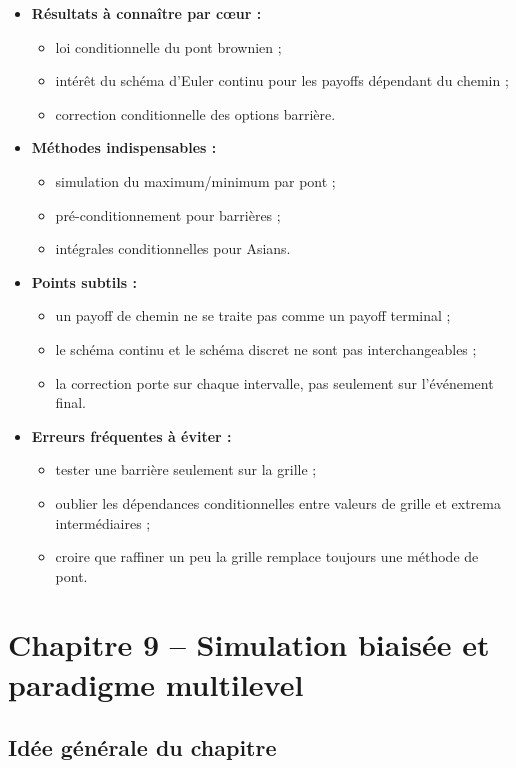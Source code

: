 \documentclass[11pt,a4paper]{article}
\begin{document}
\begin{itemize}
  \item \textbf{Résultats à connaître par cœur :}
  \begin{itemize}
    \item loi conditionnelle du pont brownien ;
    \item intérêt du schéma d'Euler continu pour les payoffs dépendant du chemin ;
    \item correction conditionnelle des options barrière.
  \end{itemize}
  \item \textbf{Méthodes indispensables :}
  \begin{itemize}
    \item simulation du maximum/minimum par pont ;
    \item pré-conditionnement pour barrières ;
    \item intégrales conditionnelles pour Asians.
  \end{itemize}
  \item \textbf{Points subtils :}
  \begin{itemize}
    \item un payoff de chemin ne se traite pas comme un payoff terminal ;
    \item le schéma continu et le schéma discret ne sont pas interchangeables ;
    \item la correction porte sur chaque intervalle, pas seulement sur l'événement final.
  \end{itemize}
  \item \textbf{Erreurs fréquentes à éviter :}
  \begin{itemize}
    \item tester une barrière seulement sur la grille ;
    \item oublier les dépendances conditionnelles entre valeurs de grille et extrema intermédiaires ;
    \item croire que raffiner un peu la grille remplace toujours une méthode de pont.
  \end{itemize}
\end{itemize}

\section{Chapitre 9 -- Simulation biaisée et paradigme multilevel}

\subsection{Idée générale du chapitre}
\end{document}
